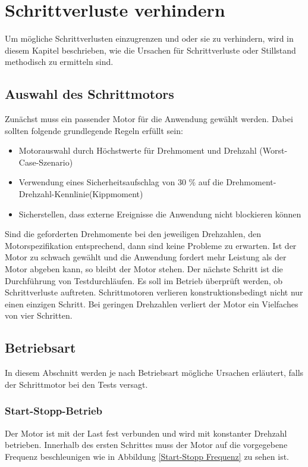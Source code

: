 \section{Schrittverluste verhindern}
Um mögliche Schrittverlusten einzugrenzen und oder sie zu verhindern, wird in diesem Kapitel beschrieben, wie die Ursachen für Schrittverluste oder Stillstand methodisch zu ermitteln sind. \cite{FaulhaberDriveSystems.2020}

\subsection{Auswahl des Schrittmotors}
Zunächst muss ein passender Motor für die Anwendung gewählt werden. Dabei sollten folgende grundlegende Regeln erfüllt sein:
\begin{itemize}
	\item Motorauswahl durch Höchstwerte für Drehmoment und Drehzahl (Worst-Case-Szenario)
	\item Verwendung eines Sicherheitsaufschlag von 30 \% auf die Drehmoment-Drehzahl-Kennlinie(Kippmoment)
	\item Sicherstellen, dass externe Ereignisse die Anwendung nicht blockieren können
\end{itemize}

Sind die geforderten Drehmomente bei den jeweiligen Drehzahlen, den Motorspezifikation entsprechend, dann sind keine Probleme zu erwarten. Ist der Motor zu schwach gewählt und die Anwendung fordert mehr Leistung als der Motor abgeben kann, so bleibt der Motor stehen. Der nächste Schritt ist die Durchführung von Testdurchläufen. Es soll im Betrieb überprüft werden, ob Schrittverluste auftreten. Schrittmotoren verlieren konstruktionsbedingt nicht nur einen einzigen Schritt. Bei geringen Drehzahlen verliert der Motor ein Vielfaches von vier Schritten.\cite{FaulhaberDriveSystems.2020}


\subsection{Betriebsart}

In diesem Abschnitt werden je nach Betriebsart mögliche Ursachen erläutert, falls der Schrittmotor bei den Tests versagt.

\subsubsection{Start-Stopp-Betrieb}

Der Motor ist mit der Last fest verbunden und wird mit konstanter Drehzahl betrieben. Innerhalb des ersten Schrittes muss der Motor auf die vorgegebene Frequenz beschleunigen wie in Abbildung \ref{Start-Stopp Frequenz} zu sehen ist.\cite{FaulhaberDriveSystems.2020} 

